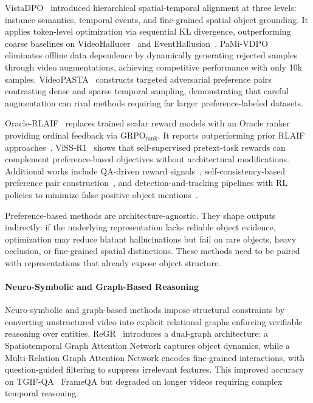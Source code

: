 \documentclass[10pt]{article} %
\begin{document}
VistaDPO~\citep{Huang2025VistaDPOVH} introduced hierarchical spatial-temporal alignment at three levels: instance semantics, temporal events, and fine-grained spatial-object grounding. It applies token-level optimization via sequential KL divergence, outperforming coarse baselines on VideoHallucer~\citep{wang2024videohallucer} and EventHallusion~\citep{Zhang2024EventHallusionDE}. PaMi-VDPO~\citep{Ding2025PaMiVDPOMV} eliminates offline data dependence by dynamically generating rejected samples through video augmentations, achieving competitive performance with only 10k samples. VideoPASTA~\citep{Kulkarni2025VideoPASTA7P} constructs targeted adversarial preference pairs contrasting dense and sparse temporal sampling, demonstrating that careful augmentation can rival methods requiring far larger preference-labeled datasets.

Oracle-RLAIF~\citep{Shi2025OracleRLAIFAI} replaces trained scalar reward models with an Oracle ranker providing ordinal feedback via GRPO$_{\text{rank}}$. It reports outperforming prior RLAIF approaches~\citep{Ahn2024TuningLM}. ViSS-R1~\citep{Fang2025ViSSR1SR} shows that self-supervised pretext-task rewards can complement preference-based objectives without architectural modifications. Additional works include QA-driven reward signals~\citep{Liu2024QAVidCapEV}, self-consistency-based preference pair construction~\citep{Dang2025SynPOSD}, and detection-and-tracking pipelines with RL policies to minimize false positive object mentions~\citep{Shankar2025AnEV}.

Preference-based methods are architecture-agnostic. They shape outputs indirectly: if the underlying representation lacks reliable object evidence, optimization may reduce blatant hallucinations but fail on rare objects, heavy occlusion, or fine-grained spatial distinctions. These methods need to be paired with representations that already expose object structure.

\paragraph{Neuro-Symbolic and Graph-Based Reasoning}

Neuro-symbolic and graph-based methods impose structural constraints by converting unstructured video into explicit relational graphs enforcing verifiable reasoning over entities. ReGR~\citep{Wang2023ReGRRG} introduces a dual-graph architecture: a Spatiotemporal Graph Attention Network captures object dynamics, while a Multi-Relation Graph Attention Network encodes fine-grained interactions, with question-guided filtering to suppress irrelevant features. This improved accuracy on TGIF-QA~\citep{jang2017tgif} FrameQA but degraded on longer videos requiring complex temporal reasoning.
\end{document}
